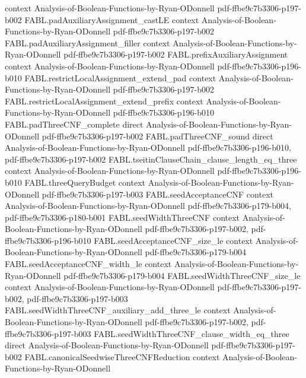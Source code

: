 \begin{theorem}
  {context}
  {Analysis-of-Boolean-Functions-by-Ryan-ODonnell}
  {pdf-ffbe9c7b3306-p197-b002}
\proofstep
  {FABL.padAuxiliaryAssignment_castLE}
  {context}
  {Analysis-of-Boolean-Functions-by-Ryan-ODonnell}
  {pdf-ffbe9c7b3306-p197-b002}
\proofstep
  {FABL.padAuxiliaryAssignment_filler}
  {context}
  {Analysis-of-Boolean-Functions-by-Ryan-ODonnell}
  {pdf-ffbe9c7b3306-p197-b002}
\proofstep
  {FABL.prefixAuxiliaryAssignment}
  {context}
  {Analysis-of-Boolean-Functions-by-Ryan-ODonnell}
  {pdf-ffbe9c7b3306-p196-b010}
\proofstep
  {FABL.restrictLocalAssignment_extend_pad}
  {context}
  {Analysis-of-Boolean-Functions-by-Ryan-ODonnell}
  {pdf-ffbe9c7b3306-p197-b002}
\proofstep
  {FABL.restrictLocalAssignment_extend_prefix}
  {context}
  {Analysis-of-Boolean-Functions-by-Ryan-ODonnell}
  {pdf-ffbe9c7b3306-p196-b010}
\proofstep
  {FABL.padThreeCNF_complete}
  {direct}
  {Analysis-of-Boolean-Functions-by-Ryan-ODonnell}
  {pdf-ffbe9c7b3306-p197-b002}
\proofstep
  {FABL.padThreeCNF_sound}
  {direct}
  {Analysis-of-Boolean-Functions-by-Ryan-ODonnell}
  {pdf-ffbe9c7b3306-p196-b010,
    pdf-ffbe9c7b3306-p197-b002}
\proofstep
  {FABL.tseitinClauseChain_clause_length_eq_three}
  {context}
  {Analysis-of-Boolean-Functions-by-Ryan-ODonnell}
  {pdf-ffbe9c7b3306-p196-b010}
\proofstep
  {FABL.threeQueryBudget}
  {context}
  {Analysis-of-Boolean-Functions-by-Ryan-ODonnell}
  {pdf-ffbe9c7b3306-p197-b003}
\proofstep
  {FABL.seedAcceptanceCNF}
  {context}
  {Analysis-of-Boolean-Functions-by-Ryan-ODonnell}
  {pdf-ffbe9c7b3306-p179-b004,
    pdf-ffbe9c7b3306-p180-b001}
\proofstep
  {FABL.seedWidthThreeCNF}
  {context}
  {Analysis-of-Boolean-Functions-by-Ryan-ODonnell}
  {pdf-ffbe9c7b3306-p197-b002,
    pdf-ffbe9c7b3306-p196-b010}
\proofstep
  {FABL.seedAcceptanceCNF_size_le}
  {context}
  {Analysis-of-Boolean-Functions-by-Ryan-ODonnell}
  {pdf-ffbe9c7b3306-p179-b004}
\proofstep
  {FABL.seedAcceptanceCNF_width_le}
  {context}
  {Analysis-of-Boolean-Functions-by-Ryan-ODonnell}
  {pdf-ffbe9c7b3306-p179-b004}
\proofstep
  {FABL.seedWidthThreeCNF_size_le}
  {context}
  {Analysis-of-Boolean-Functions-by-Ryan-ODonnell}
  {pdf-ffbe9c7b3306-p197-b002,
    pdf-ffbe9c7b3306-p197-b003}
\proofstep
  {FABL.seedWidthThreeCNF_auxiliary_add_three_le}
  {context}
  {Analysis-of-Boolean-Functions-by-Ryan-ODonnell}
  {pdf-ffbe9c7b3306-p197-b002,
    pdf-ffbe9c7b3306-p197-b003}
\proofstep
  {FABL.seedWidthThreeCNF_clause_width_eq_three}
  {direct}
  {Analysis-of-Boolean-Functions-by-Ryan-ODonnell}
  {pdf-ffbe9c7b3306-p197-b002}
\proofstep
  {FABL.canonicalSeedwiseThreeCNFReduction}
  {context}
  {Analysis-of-Boolean-Functions-by-Ryan-ODonnell}

\end{theorem}
